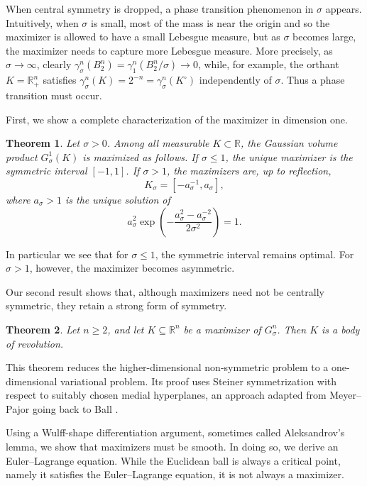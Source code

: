 \documentclass[12pt,oneside,reqno]{amsart}
\numberwithin{equation}{section}
\newtheorem{theorem}{Theorem}[section]
\theoremstyle{remark}
\newcommand{\R}{\mathbb R}
\begin{document}
When central symmetry is dropped, a phase transition phenomenon in $\sigma$ appears. Intuitively, when $\sigma$ is small, most of the mass is near the origin and so the maximizer is allowed to have a small Lebesgue measure, but as $\sigma$ becomes large, the maximizer needs to capture more Lebesgue measure. More precisely, as $\sigma\to \infty$, clearly $\gamma_\sigma^n(B_2^n)=\gamma_1^n(B_2^n/\sigma)\to0$, while, for example, the orthant $K=\R_+^n$ satisfies $\gamma_\sigma^n(K)=2^{-n}=\gamma_\sigma^n(K^\circ)$ independently of $\sigma$. Thus a phase transition must occur. 

First, we show a complete characterization of the maximizer in dimension one.

\begin{theorem}\label{thm:one-dimensional}
Let $\sigma>0$. Among all measurable $K\subset\R$, the Gaussian volume product $G_\sigma^1(K)$
is maximized as follows. 
If $\sigma\le1$, the unique maximizer is the symmetric interval $[-1,1]$.
If $\sigma>1$, the maximizers are, up to reflection,
\[
        K_\sigma=[-a_\sigma^{-1},a_\sigma],
\]
where $a_\sigma>1$ is the unique solution of
\begin{equation}\label{eq:asigma}
        a_\sigma^2\exp\left(-\frac{a_\sigma^2-a_\sigma^{-2}}{2\sigma^2}\right)=1.
\end{equation}
\end{theorem}

In particular we see that for $\sigma\le1$, the symmetric interval remains optimal. For $\sigma>1$, however, the maximizer becomes asymmetric. 

Our second result shows that, although maximizers need not be centrally symmetric, they retain a strong form of symmetry. 

\begin{theorem}\label{thm:revolution}
 Let $n\ge2$, and let $K\subseteq \R^n$ be a maximizer of $G^n_\sigma$. Then $K$ is a body of revolution. 
\end{theorem}

This theorem reduces the higher-dimensional non-symmetric problem to a one-dimensional variational problem. Its proof uses Steiner symmetrization with respect to suitably chosen medial hyperplanes, an approach adapted from Meyer--Pajor \cite{MeyerPajorSantalo} going back to Ball \cite{Ball-thesis}.

Using a Wulff-shape differentiation argument, sometimes called Aleksandrov's lemma, we show that maximizers must be smooth. In doing so, we derive an Euler--Lagrange equation. 
While the Euclidean ball is always a critical point, namely it satisfies the Euler--Lagrange equation, it is not always a maximizer.
\end{document}
